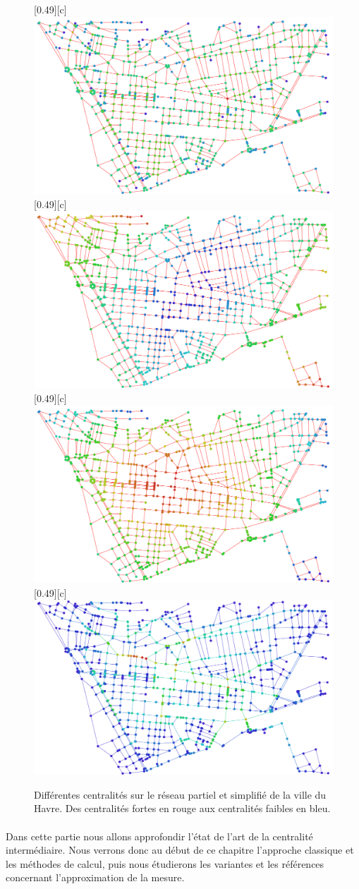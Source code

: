 \documentclass[a4paper, 10pt]{report}
\begin{document}
\begin{figure}[htbp]
	\centering
	[0.49\linewidth][c]{
		\includegraphics[width=0.49\linewidth]{./img/degree_centrality.pdf}
	}
	\hfill
	[0.49\linewidth][c]{
		\includegraphics[width=0.49\linewidth]{./img/max_farness_centrality.pdf}
	}
	\hfill
	[0.49\linewidth][c]{
		\includegraphics[width=0.49\linewidth]{./img/closeness_centrality.pdf}
	}
	\hfill
	[0.49\linewidth][c]{
		\includegraphics[width=0.49\linewidth]{./img/betwenness_centrality.pdf}
	}
	\caption{Différentes centralités sur le réseau partiel et simplifié de la ville du Havre. Des centralités fortes en rouge aux centralités faibles en bleu.}
	\label{fig:centralities}
\end{figure}

\paragraph{}Dans cette partie nous allons approfondir l'état de l'art de la centralité intermédiaire. Nous verrons donc au début de ce chapitre l'approche classique et les méthodes de calcul, puis nous étudierons les variantes et les références concernant l'approximation de la mesure.
\end{document}
